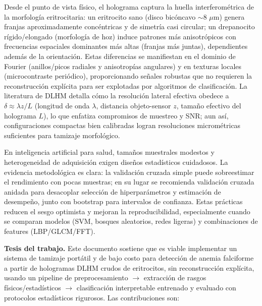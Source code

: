 Desde el punto de vista físico, el holograma captura la huella interferométrica de la morfología eritrocitaria: un eritrocito sano (disco bicóncavo $\sim$8 $\mu$m) genera franjas aproximadamente concéntricas y de simetría casi circular; un drepanocito rígido/elongado (morfología de hoz) induce patrones más anisotrópicos con frecuencias espaciales dominantes más altas (franjas más juntas), dependientes además de la orientación. Estas diferencias se manifiestan en el dominio de Fourier (anillos/picos radiales y anisotropías angulares) y en texturas locales (microcontraste periódico), proporcionando señales robustas que no requieren la reconstrucción explícita para ser explotadas por algoritmos de clasificación. La literatura de DLHM detalla cómo la resolución lateral efectiva obedece a $\delta \approx \lambda z / L$ (longitud de onda $\lambda$, distancia objeto-sensor $z$, tamaño efectivo del holograma $L$), lo que enfatiza compromisos de muestreo y SNR; aun así, configuraciones compactas bien calibradas logran resoluciones micrométricas suficientes para tamizaje morfológico.

En inteligencia artificial para salud, tamaños muestrales modestos y heterogeneidad de adquisición exigen diseños estadísticos cuidadosos. La evidencia metodológica es clara: la validación cruzada simple puede sobreestimar el rendimiento con pocas muestras; en su lugar se recomienda validación cruzada anidada para desacoplar selección de hiperparámetros y estimación de desempeño, junto con bootstrap para intervalos de confianza. Estas prácticas reducen el sesgo optimista y mejoran la reproducibilidad, especialmente cuando se comparan modelos (SVM, bosques aleatorios, redes ligeras) y combinaciones de features (LBP/GLCM/FFT).

\textbf{Tesis del trabajo.} Este documento sostiene que es viable implementar un sistema de tamizaje portátil y de bajo costo para detección de anemia falciforme a partir de hologramas DLHM crudos de eritrocitos, sin reconstrucción explícita, usando un pipeline de preprocesamiento $\rightarrow$ extracción de rasgos físicos/estadísticos $\rightarrow$ clasificación interpretable entrenado y evaluado con protocolos estadísticos rigurosos. Las contribuciones son:

